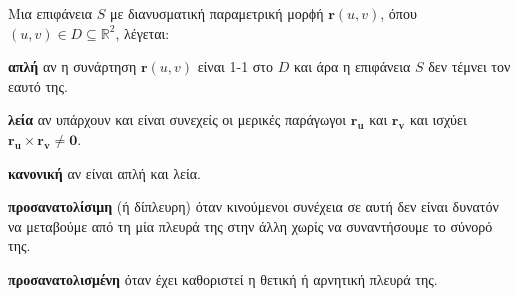 




\everymath{\displaystyle}
\pagestyle{askhseis}




\setcounter{chapter}{1}




\begin{dfn}
  Μια επιφάνεια $S$ με διανυσματική παραμετρική μορϕή $ \mathbf{r}(u,v) $, όπου 
  $ (u,v) \in D \subseteq \mathbb{R}^{2} $, λέγεται:
  \begin{myitemize}
    \item \textbf{απλή} αν η συνάρτηση $ \mathbf{r}(u,v) $ είναι 1-1 στο $D$ και άρα
      η επιφάνεια $S$ δεν τέμνει τον εαυτό της.
    \item \textbf{λεία} αν υπάρχουν και είναι συνεχείς οι μερικές παράγωγοι 
      $ \mathbf{r_{u}}$ και $ \mathbf{r_{v}} $ και ισχύει 
      $ \mathbf{r_{u}} \times \mathbf{r_{v}} \neq \mathbf{0} $.
    \item \textbf{κανονική} αν είναι απλή και λεία. 
    \item \textbf{προσανατολίσιμη} (ή δίπλευρη) όταν κινούμενοι συνέχεια σε αυτή δεν 
      είναι δυνατόν να μεταβούμε από τη μία πλευρά της στην άλλη χωρίς να συναντήσουμε 
      το σύνορό της.
    \item \textbf{προσανατολισμένη} όταν έχει καθοριστεί η θετική ή αρνητική πλευρά της.
  \end{myitemize}
\end{dfn}

